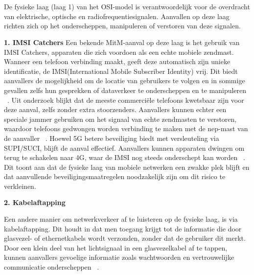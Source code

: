 \section{}%
\label{sec:MitM-aanvallen per OSI-laag}

\subsection{}
\label{sec:MitM-aanvallen-op-fysieke-laag}
De fysieke laag (laag 1) van het OSI-model is verantwoordelijk voor de overdracht van elektrische, optische en radiofrequentiesignalen. Aanvallen op deze laag richten zich op het onderscheppen, manipuleren of verstoren van deze signalen. 

\vspace{0.5cm}
\textbf{1. IMSI Catchers}
Een bekende MitM-aanval op deze laag is het gebruik van IMSI Catchers, apparaten die zich voordoen als een echte mobiele zendmast. Wanneer een telefoon verbinding maakt, geeft deze automatisch zijn unieke identificatie, de IMSI(International Mobile Subscriber Identity) vrij. Dit biedt aanvallers de mogelijkheid om de locatie van gebruikers te volgen en in sommige gevallen zelfs hun gesprekken of dataverkeer te onderscheppen en te manipuleren ~\autocite{PALAMA2021}.
Uit onderzoek blijkt dat de meeste commerciële telefoons kwetsbaar zijn voor deze aanval, zelfs zonder extra stoorzenders. Aanvallers kunnen echter een speciale jammer gebruiken om het signaal van echte zendmasten te verstoren, waardoor telefoons gedwongen worden verbinding te maken met de nep-mast van de aanvaller ~\autocite{PALAMA2021}. Hoewel 5G betere beveiliging biedt met versleuteling via SUPI/SUCI, blijft de aanval effectief. Aanvallers kunnen apparaten dwingen om terug te schakelen naar 4G, waar de IMSI nog steeds onderschept kan worden ~\autocite{PALAMA2021}. Dit toont aan dat de fysieke laag van mobiele netwerken een zwakke plek blijft en dat aanvullende beveiligingsmaatregelen noodzakelijk zijn om dit risico te verkleinen.

\vspace{0.5cm}
\textbf{2. Kabelaftapping}

Een andere manier om netwerkverkeer af te luisteren op de fysieke laag, is via kabelaftapping. Dit houdt in dat men toegang krijgt tot de informatie die door glasvezel- of ethernetkabels wordt verzonden, zonder dat de gebruiker dit merkt. Door een klein deel van het lichtsignaal in een glasvezelkabel af te tappen, kunnen aanvallers gevoelige informatie zoals wachtwoorden en vertrouwelijke communicatie onderscheppen ~\autocite{EVERETT2007}. 

